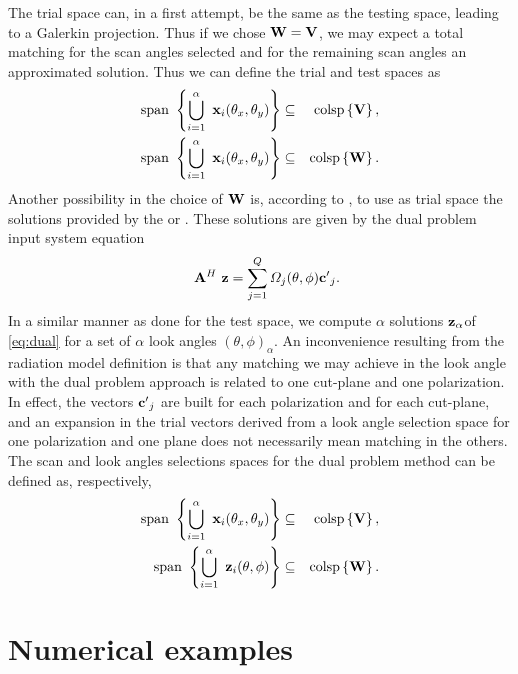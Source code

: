 \par The trial space can, in a first attempt, be the same as the testing space, leading to a Galerkin projection. Thus if we chose $\mathbf{W} = \mathbf{V}$, we may expect a total matching for the scan angles selected and for the remaining scan angles an approximated solution. Thus we can define the trial and test spaces as
\begin{eqnarray}
\mrm{span} \ \left \{ \bigcup_{i=1}^\alpha  \ \vect{x}_i(\theta_x, \theta_y) \right \} & \subseteq & \colspan{\mat V}, \\
\mrm{span} \ \left \{ \bigcup_{i=1}^\alpha \  \vect{x}_i(\theta_x, \theta_y) \right \} & \subseteq & \colspan{\mat W}.
\end{eqnarray} Another possibility in the choice of $\mathbf{W}$ is, according to \cite{LedgerPerairePESSRIWA}, to use as trial space the solutions provided by the  or . These solutions are given by the dual problem input system equation
\begin{eqnarray}
\label{eq:dual}
& & \mat{A}^H \ \vect z = \sum_{j=1}^Q \Omega_j(\theta, \phi) \mat{c}{'}_j.
\end{eqnarray} In a similar manner as done for the test space, we compute $\alpha$ solutions $\vect{z}_\alpha$of \eqref{eq:dual} for a set of $\alpha$ look angles $(\theta, \phi)_\alpha$. An inconvenience resulting from the radiation model definition is that any matching we may achieve in the look angle with the dual problem approach is related to one cut-plane and one polarization. In effect, the vectors $\mathbf{c}{'}_j$ are built for each polarization and for each cut-plane, and an expansion in the trial vectors derived from a look angle selection space for one polarization and one plane does not necessarily mean matching in the others. The scan and look angles selections spaces for the dual problem method can be defined as, respectively,
\begin{eqnarray}
\mrm{span} \ \left \{ \bigcup_{i=1}^\alpha  \ \vect{x}_i(\theta_x, \theta_y) \right \} & \subseteq & \colspan{\mat V}, \\
\mrm{span} \ \left \{ \bigcup_{i=1}^\alpha \  \vect{z}_i(\theta,\phi) \right \} & \subseteq & \colspan{\mat W}.
\end{eqnarray}

\section{Numerical examples}

